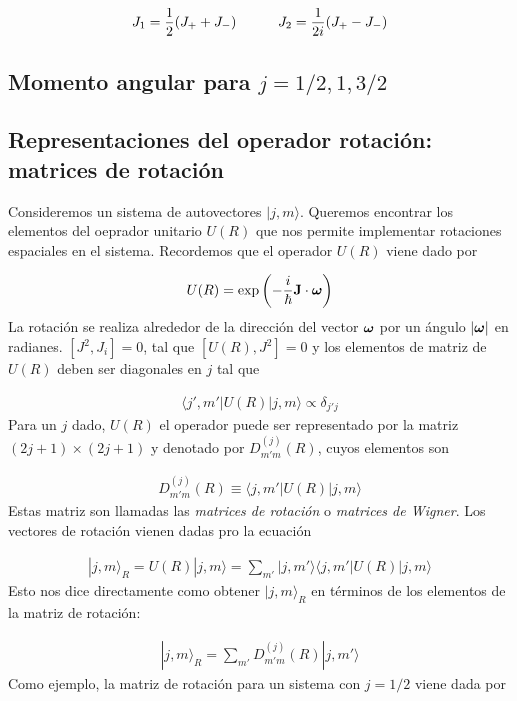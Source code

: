 \begin{eqnarray}
	J_1 = \frac{1}{2} (J_+ + J_-) \quad \quad \quad J_2 = \frac{1}{2i} (J_+-J_-)
\end{eqnarray}


\subsection{Momento angular para $j=1/2,1,3/2$}

\subsection{Representaciones del operador rotación: matrices de rotación}

Consideremos un sistema de autovectores $|j,m\rangle$. Queremos encontrar los elementos del oeprador unitario $U(R)$ que nos permite implementar rotaciones espaciales en el sistema. Recordemos que el operador $U(R)$ viene dado por 

\begin{eqnarray}
	U(R) = \exp \left( - \frac{i}{\hbar} \mathbf{J} \cdot \boldsymbol{\omega} \right)
\end{eqnarray}
La rotación se realiza alrededor de la dirección del vector $\boldsymbol{\omega}$ por un ángulo $|\boldsymbol{\omega}|$ en radianes. $[J^2,J_i]=0$, tal que $[U(R),J^2]=0$ y los elementos de matriz de $U(R)$ deben ser diagonales en $j$ tal que

\begin{eqnarray}
	\langle j',m' |U(R)|j,m\rangle \propto \delta_{j'j}
\end{eqnarray}
Para un $j$ dado, $U(R)$ el operador puede ser representado por la matriz $(2j+1)\times (2j+1)$ y denotado por $D_{m'm}^{(j)} (R)$, cuyos elementos son

\begin{eqnarray}
	D_{m'm}^{(j)} (R) \equiv \langle j,m' |U(R) | j,m\rangle
\end{eqnarray}
Estas matriz son llamadas las \textit{matrices de rotación} o \textit{matrices de Wigner}. Los vectores de rotación vienen dadas pro la ecuación

\begin{eqnarray}
	|j,m\rangle_R = U(R) |j,m\rangle = \sum_{m'} |j,m'\rangle \langle j,m'|U(R)| j,m\rangle
\end{eqnarray}
Esto nos dice directamente como obtener $|j,m\rangle_R$ en términos de los elementos de la matriz de rotación:

\begin{eqnarray}
	|j,m\rangle_R = \sum_{m'} D_{m'm}^{(j)} (R) |j,m'\rangle
\end{eqnarray}
Como ejemplo, la matriz de rotación para un sistema con $j=1/2$ viene dada por 


